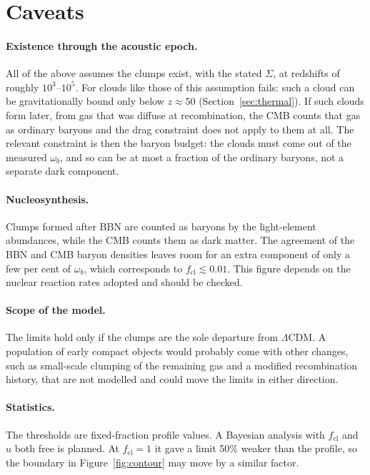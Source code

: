 \documentclass[11pt,a4paper]{article}
\newcommand{\cl}{\mathrm{cl}}
\begin{document}
\section{Caveats}
\label{sec:caveats}

\paragraph{Existence through the acoustic epoch.} All of the above assumes the clumps exist, with the stated $\Sigma$, at redshifts of roughly $10^{3}$--$10^{5}$. For clouds like those of \citet{WalkerWardle1998} this assumption fails: such a cloud can be gravitationally bound only below $z \approx 50$ (Section~\ref{sec:thermal}). If such clouds form later, from gas that was diffuse at recombination, the CMB counts that gas as ordinary baryons and the drag constraint does not apply to them at all. The relevant constraint is then the baryon budget: the clouds must come out of the measured $\omega_b$, and so can be at most a fraction of the ordinary baryons, not a separate dark component.

\paragraph{Nucleosynthesis.} Clumps formed after BBN are counted as baryons by the light-element abundances, while the CMB counts them as dark matter. The agreement of the BBN and CMB baryon densities leaves room for an extra component of only a few per cent of $\omega_b$, which corresponds to $f_\cl \lesssim 0.01$. This figure depends on the nuclear reaction rates adopted and should be checked.

\paragraph{Scope of the model.} The limits hold only if the clumps are the sole departure from $\Lambda$CDM. A population of early compact objects would probably come with other changes, such as small-scale clumping of the remaining gas and a modified recombination history, that are not modelled and could move the limits in either direction.

\paragraph{Statistics.} The thresholds are fixed-fraction profile values. A Bayesian analysis with $f_\cl$ and $u$ both free is planned. At $f_\cl = 1$ it gave a limit 50\% weaker than the profile, so the boundary in Figure~\ref{fig:contour} may move by a similar factor.
\end{document}
